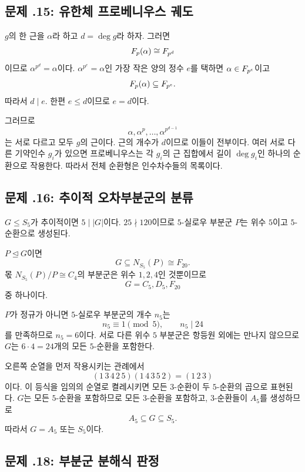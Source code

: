 \subsection*{문제 \thechapter.15: 유한체 프로베니우스 궤도}

\begin{solution}
$g$의 한 근을 $\alpha$라 하고 $d=\deg g$라 하자. 그러면
\[
  F_p(\alpha)\cong F_{p^d}
\]
이므로 $\alpha^{p^d}=\alpha$이다. $\alpha^{p^e}=\alpha$인 가장 작은 양의 정수 $e$를 택하면 $\alpha\in F_{p^e}$이고
\[
  F_p(\alpha)\subseteq F_{p^e}.
\]
따라서 $d\mid e$. 한편 $e\le d$이므로 $e=d$이다.

그러므로
\[
  \alpha,\alpha^p,\dots,\alpha^{p^{d-1}}
\]
는 서로 다르고 모두 $g$의 근이다. 근의 개수가 $d$이므로 이들이 전부이다. 여러 서로 다른 기약인수 $g_i$가 있으면 프로베니우스는 각 $g_i$의 근 집합에서 길이 $\deg g_i$인 하나의 순환으로 작용한다. 따라서 전체 순환형은 인수차수들의 목록이다.
\end{solution}

\subsection*{문제 \thechapter.16: 추이적 오차부분군의 분류}

\begin{solution}
$G\le S_5$가 추이적이면 $5\mid|G|$이다. $25\nmid120$이므로 $5$-실로우 부분군 $P$는 위수 $5$이고 $5$-순환으로 생성된다.

$P\trianglelefteq G$이면
\[
  G\subseteq N_{S_5}(P)\cong F_{20}.
\]
몫 $N_{S_5}(P)/P\cong C_4$의 부분군은 위수 $1,2,4$인 것뿐이므로
\[
  G=C_5,D_5,F_{20}
\]
중 하나이다.

$P$가 정규가 아니면 $5$-실로우 부분군의 개수 $n_5$는
\[
  n_5\equiv1\pmod5,
  \qquad n_5\mid24
\]
를 만족하므로 $n_5=6$이다. 서로 다른 위수 $5$ 부분군은 항등원 외에는 만나지 않으므로 $G$는 $6\cdot4=24$개의 모든 $5$-순환을 포함한다.

오른쪽 순열을 먼저 작용시키는 관례에서
\[
  (1\,3\,4\,2\,5)(1\,4\,3\,5\,2)
  =(1\,2\,3)
\]
이다. 이 등식을 임의의 순열로 켤레시키면 모든 $3$-순환이 두 $5$-순환의 곱으로 표현된다. $G$는 모든 $5$-순환을 포함하므로 모든 $3$-순환을 포함하고, $3$-순환들이 $A_5$를 생성하므로
\[
  A_5\subseteq G\subseteq S_5.
\]
따라서 $G=A_5$ 또는 $S_5$이다.
\end{solution}

\subsection*{문제 \thechapter.18: 부분군 분해식 판정}

